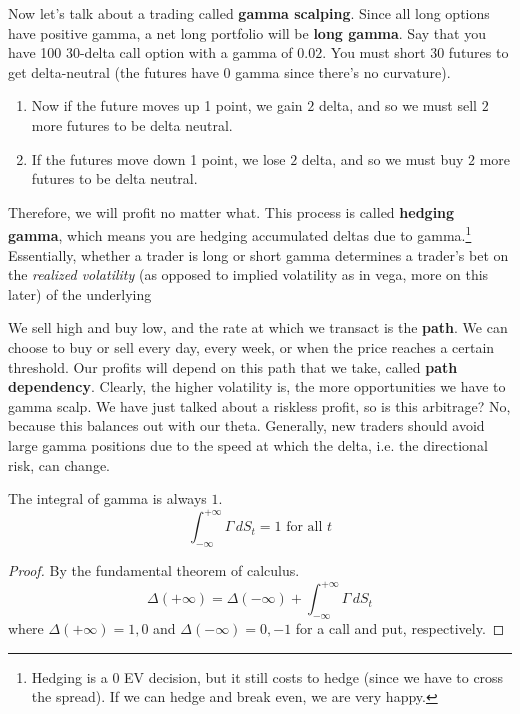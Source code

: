\documentclass{article}
\begin{document}
    Now let's talk about a trading called \textbf{gamma scalping}. Since all long options have positive gamma, a net long portfolio will be \textbf{long gamma}. Say that you have 100 $30$-delta call option with a gamma of $0.02$. You must short $30$ futures to get delta-neutral (the futures have $0$ gamma since there's no curvature).

    \begin{enumerate}
      \item Now if the future moves up 1 point, we gain $2$ delta, and so we must sell $2$ more futures to be delta neutral.
      \item If the futures move down 1 point, we lose $2$ delta, and so we must buy $2$ more futures to be delta neutral.
    \end{enumerate}
    Therefore, we will profit no matter what. This process is called \textbf{hedging gamma}, which means you are hedging accumulated deltas due to gamma.\footnote{Hedging is a $0$ EV decision, but it still costs to hedge (since we have to cross the spread). If we can hedge and break even, we are very happy.} Essentially, whether a trader is long or short gamma determines a trader's bet on the \textit{realized volatility} (as opposed to implied volatility as in vega, more on this later) of the underlying

    We sell high and buy low, and the rate at which we transact is the \textbf{path}. We can choose to buy or sell every day, every week, or when the price reaches a certain threshold. Our profits will depend on this path that we take, called \textbf{path dependency}. Clearly, the higher volatility is, the more opportunities we have to gamma scalp. We have just talked about a riskless profit, so is this arbitrage? No, because this balances out with our theta. Generally, new traders should avoid large gamma positions due to the speed at which the delta, i.e. the directional risk, can change. 

    \begin{lemma}
      \label{thm:integral-of-gamma}
      The integral of gamma is always $1$.
      \begin{equation}
        \int_{-\infty}^{+\infty} \Gamma \,dS_t = 1 \text{ for all } t
      \end{equation}
    \end{lemma}
    \begin{proof}
      By the fundamental theorem of calculus.
      \begin{equation}
        \Delta (+\infty) = \Delta(-\infty) + \int_{-\infty}^{+\infty} \Gamma \,dS_t
      \end{equation}
      where $\Delta(+\infty) = 1, 0$ and $\Delta(-\infty) = 0, -1$ for a call and put, respectively.
    \end{proof}
\end{document}
